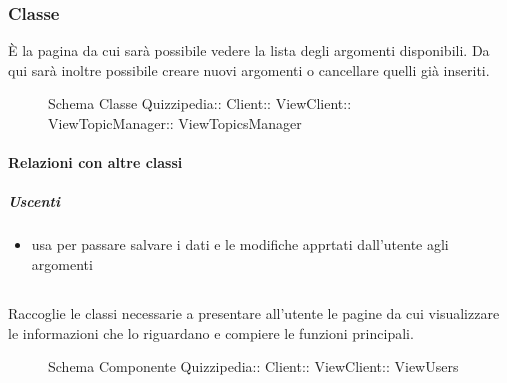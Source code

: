 \subsubsection{Classe }
È la pagina da cui sarà possibile vedere la lista degli argomenti disponibili. Da qui sarà inoltre possibile creare nuovi argomenti o cancellare quelli già inseriti.
\begin{figure}[H]
\centering
\noindent{}
\caption[Schema Classe ViewTopicsManager]{Schema Classe Quizzipedia:: Client:: ViewClient:: ViewTopicManager:: ViewTopicsManager}
\end{figure}
\paragraph{Relazioni con altre classi}
\subparagraph{Uscenti}
\begin{itemize}
\item usa  per passare salvare i dati e le modifiche apprtati dall'utente agli argomenti
\end{itemize}
\subsection{}
Raccoglie le classi necessarie a presentare all'utente le pagine da cui visualizzare le informazioni che lo riguardano e compiere le funzioni principali.
\begin{figure}[H]
\centering
\noindent{}
\caption[Schema Componente ViewUsers]{Schema Componente Quizzipedia:: Client:: ViewClient:: ViewUsers}
\end{figure}
